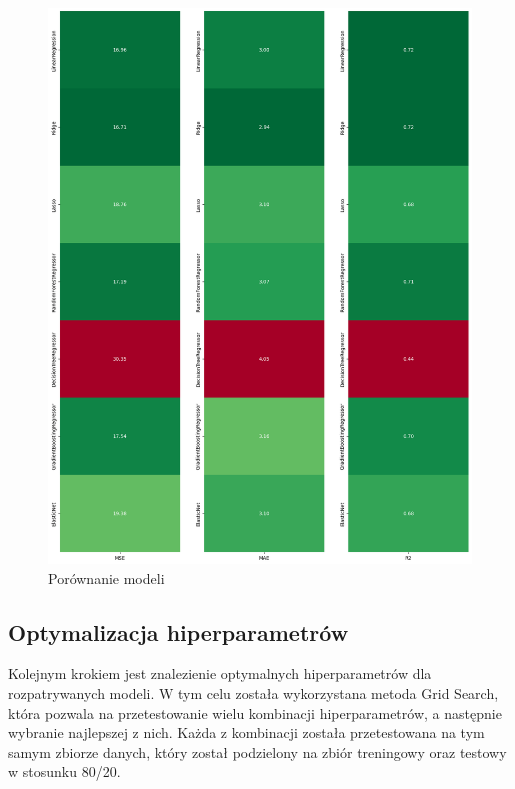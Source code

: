 \documentclass{article}
\begin{document}
\begin{multicols}{2}
\begin{figure}[H]
    \includegraphics[scale=0.25]{graphs/all_models_comparsion.png}
    \caption{Porównanie modeli}
    \centering
\end{figure}
\end{multicols}

\subsection{Optymalizacja hiperparametrów}
Kolejnym krokiem jest znalezienie optymalnych hiperparametrów dla rozpatrywanych modeli. W tym celu została wykorzystana metoda Grid Search,
która pozwala na przetestowanie wielu kombinacji hiperparametrów, a następnie wybranie najlepszej z nich.
Każda z kombinacji została przetestowana na tym samym zbiorze danych, który został podzielony na zbiór treningowy oraz testowy w stosunku 80/20.
\end{document}
